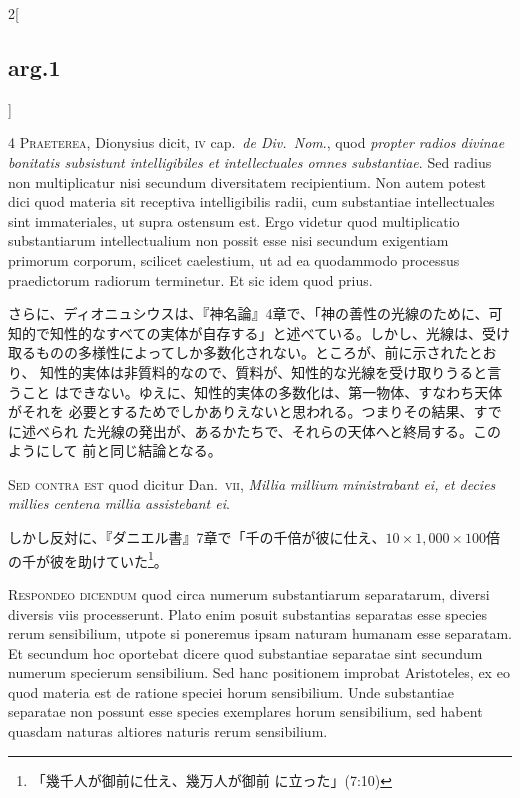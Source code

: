 \documentclass[paper=a4paper,fontsize=10pt,jafontsize=9pt,titlepage]{jlreq}
\begin{document}
\begin{paracol}{2}[\subsection{arg.1}]

{\scshape 4 Praeterea}, Dionysius dicit, {\scshape iv} cap.~{\itshape de
Div.~Nom}., quod {\itshape propter radios divinae bonitatis subsistunt
intelligibiles et intellectuales omnes substantiae}. Sed radius non
multiplicatur nisi secundum diversitatem recipientium. Non autem potest
dici quod materia sit receptiva intelligibilis radii, cum substantiae
intellectuales sint immateriales, ut supra ostensum est. Ergo videtur
quod multiplicatio substantiarum intellectualium non possit esse nisi
secundum exigentiam primorum corporum, scilicet caelestium, ut ad ea
quodammodo processus praedictorum radiorum terminetur. Et sic idem quod
prius.

\switchcolumn

さらに、ディオニュシウスは、『神名論』4章で、「神の善性の光線のために、可
 知的で知性的なすべての実体が自存する」と述べている。しかし、光線は、受け
 取るものの多様性によってしか多数化されない。ところが、前に示されたとおり、
 知性的実体は非質料的なので、質料が、知性的な光線を受け取りうると言うこと
 はできない。ゆえに、知性的実体の多数化は、第一物体、すなわち天体がそれを
 必要とするためでしかありえないと思われる。つまりその結果、すでに述べられ
 た光線の発出が、あるかたちで、それらの天体へと終局する。このようにして
 前と同じ結論となる。

\switchcolumn*[\subsection{s.c.}]

{\scshape Sed contra est} quod dicitur Dan.~{\scshape vii}, {\itshape Millia
millium ministrabant ei, et decies millies centena millia assistebant
ei}.

\switchcolumn

しかし反対に、『ダニエル書』7章で「千の千倍が彼に仕え、$10 \times 1,000 \times
 100$倍の千が彼を助けていた\footnote{「幾千人が御前に仕え、幾万人が御前
 に立った」(7:10)}。


{\scshape Respondeo dicendum} quod circa numerum
substantiarum separatarum, diversi diversis viis processerunt. Plato
enim posuit substantias separatas esse species rerum sensibilium, utpote
si poneremus ipsam naturam humanam esse separatam. Et secundum hoc
oportebat dicere quod substantiae separatae sint secundum numerum
specierum sensibilium. Sed hanc positionem improbat Aristoteles, ex eo
quod materia est de ratione speciei horum sensibilium. Unde substantiae
separatae non possunt esse species exemplares horum sensibilium, sed
habent quasdam naturas altiores naturis rerum sensibilium.


\end{paracol}
\end{document}
